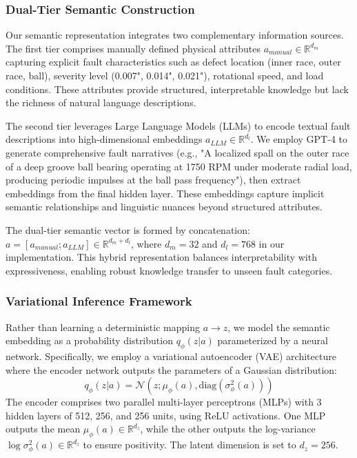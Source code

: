 \subsubsection{Dual-Tier Semantic Construction}
Our semantic representation integrates two complementary information sources. The first tier comprises manually defined physical attributes $a_{manual} \in \mathbb{R}^{d_m}$ capturing explicit fault characteristics such as defect location (inner race, outer race, ball), severity level (0.007", 0.014", 0.021"), rotational speed, and load conditions. These attributes provide structured, interpretable knowledge but lack the richness of natural language descriptions.

The second tier leverages Large Language Models (LLMs) to encode textual fault descriptions into high-dimensional embeddings $a_{LLM} \in \mathbb{R}^{d_l}$. We employ GPT-4 to generate comprehensive fault narratives (e.g., "A localized spall on the outer race of a deep groove ball bearing operating at 1750 RPM under moderate radial load, producing periodic impulses at the ball pass frequency"), then extract embeddings from the final hidden layer. These embeddings capture implicit semantic relationships and linguistic nuances beyond structured attributes.

The dual-tier semantic vector is formed by concatenation: $a = [a_{manual}; a_{LLM}] \in \mathbb{R}^{d_m + d_l}$, where $d_m=32$ and $d_l=768$ in our implementation. This hybrid representation balances interpretability with expressiveness, enabling robust knowledge transfer to unseen fault categories.

\subsubsection{Variational Inference Framework}
Rather than learning a deterministic mapping $a \rightarrow z$, we model the semantic embedding as a probability distribution $q_\phi(z|a)$ parameterized by a neural network. Specifically, we employ a variational autoencoder (VAE) architecture where the encoder network outputs the parameters of a Gaussian distribution:
\begin{equation}
    q_\phi(z|a) = \mathcal{N}(z; \mu_\phi(a), \text{diag}(\sigma_\phi^2(a)))
    \label{eq:variational_posterior}
\end{equation}
The encoder comprises two parallel multi-layer perceptrons (MLPs) with 3 hidden layers of 512, 256, and 256 units, using ReLU activations. One MLP outputs the mean $\mu_\phi(a) \in \mathbb{R}^{d_z}$, while the other outputs the log-variance $\log \sigma_\phi^2(a) \in \mathbb{R}^{d_z}$ to ensure positivity. The latent dimension is set to $d_z=256$.

